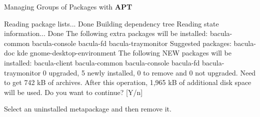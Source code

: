 \begin{Lab}
\begin{exe} {Managing Groups of Packages with \textbf{APT}}
      \begin{out}[]
Reading package lists... Done
Building dependency tree
Reading state information... Done
The following extra packages will be installed:
  bacula-common bacula-console bacula-fd bacula-traymonitor
Suggested packages:
  bacula-doc kde gnome-desktop-environment
The following NEW packages will be installed:
  bacula-client bacula-common bacula-console bacula-fd bacula-traymonitor
0 upgraded, 5 newly installed, 0 to remove and 0 not upgraded.
Need to get 742 kB of archives.
After this operation, 1,965 kB of additional disk space will be used.
Do you want to continue? [Y/n]
   \end{out}
      Select an uninstalled metapackage and then remove it.
   \end{exe}

\end{Lab}










